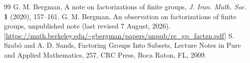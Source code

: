 \documentclass[10pt,a4paper]{amsart}
\begin{document}
\begin{thebibliography}{99}
 G. M. Bergman, A note on factorizations of finite groups, {\it J. Iran. Math. Soc.} {\bf 1} (2020), 157--161.
 G. M. Bergman, An observation on factorizations of finite groups, unpublished note (last revised 7 August, 2026). [\url{https://math.berkeley.edu/~gbergman/papers/unpub/re_gp_factzn.pdf}]
 S. Szab\'o and A. D. Sands, Factoring Groups Into Subsets, Lecture Notes in Pure and Applied Mathematics, 257, CRC Press, Boca Raton, FL, 2009.
\end{thebibliography}
\end{document}
